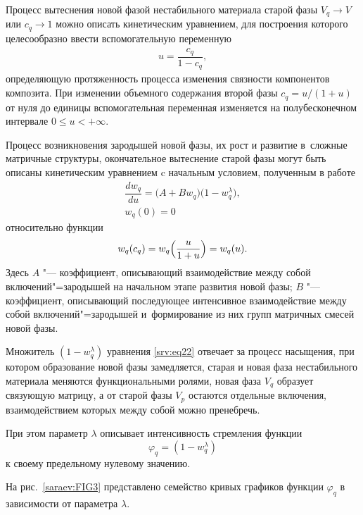 Процесс вытеснения новой фазой нестабильного материала старой фазы $V_{q} \to V$ или $c_{q} \to 1$ можно описать кинетическим уравнением, для построения которого целесообразно ввести вспомогательную переменную
\begin{equation}\label{srv:eq21}
\begin{array}{c}
u=\dfrac{c_{q}}{1-c_{q}},
\end{array}
\end{equation}
определяющую протяженность процесса изменения связности компонентов композита. При изменении объемного содержания второй фазы  $c_{q}={u}/({1+u})$  от нуля до единицы вспомогательная переменная изменяется на полубесконечном интервале $0 \leq u < + \infty$.

Процесс возникновения зародышей новой фазы, их рост и развитие в~сложные матричные структуры, окончательное вытеснение старой фазы могут быть описаны кинетическим уравнением c начальным условием, полученным в работе \cite{Saraev2015} 
\begin{equation}\label{srv:eq22}
\begin{array}{c}
\dfrac{dw_{q}}{du}=\big(A+B w_{q}\big) \big(1-w_{q}^\lambda\big),\\
w_{q}(0)=0
\end{array}
\end{equation}
относительно функции
\begin{equation}
\begin{array}{c}
w_{q}(c_q)=w_{q}\Bigl(\dfrac{u}{1+u}\Bigr)=w_{q}(u).
\end{array}
\end{equation}
Здесь $A$ "--- коэффициент, описывающий взаимодействие между собой включений"=зародышей на начальном этапе развития новой фазы; 
$B$ "--- коэффициент, описывающий последующее интенсивное взаимодействие между собой включений"=зародышей и~формирование из них групп матричных смесей новой фазы.

Множитель $(1-w_{q}^\lambda )$  уравнения \eqref{srv:eq22} отвечает за процесс насыщения, при котором образование новой фазы замедляется, старая и новая фаза нестабильного материала меняются функциональными ролями, новая фаза $V_{q}$ образует связующую матрицу, а от старой фазы $V_{p}$ остаются отдельные включения, взаимодействием которых между собой можно пренебречь.

При этом параметр $\lambda$  описывает интенсивность стремления функции
$$\varphi_{q}= (1-w_{q}^\lambda )$$
к своему предельному нулевому значению.


На рис.~\ref{saraev:FIG3} представлено семейство кривых графиков функции $\varphi_{q}$ в зависимости от параметра $\lambda$.


